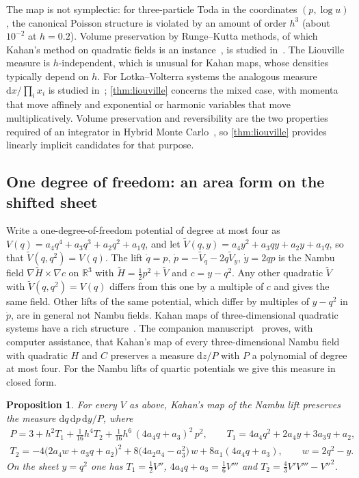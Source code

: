 \documentclass[11pt,a4paper]{article}
\newtheorem{proposition}[theorem]{Proposition}
\theoremstyle{definition}
\theoremstyle{remark}
\newcommand{\R}{\mathbb{R}}
\newcommand{\dd}{\mathrm{d}}
\begin{document}
The map is not symplectic: for three-particle Toda in the coordinates $(p,\log u)$, the canonical Poisson
structure is violated by an amount of order $h^3$ (about $10^{-2}$ at $h=0.2$). Volume preservation by
Runge--Kutta methods, of which Kahan's method on quadratic fields is an instance~\cite{CMOQ13}, is studied
in~\cite{BMQW16}.
The Liouville measure is $h$-independent, which is unusual for Kahan maps, whose densities typically depend on
$h$. For Lotka--Volterra systems the analogous measure $\dd x/\prod_ix_i$ is studied
in~\cite{KQV16,vdKMMQ24,LP}; \cref{thm:liouville} concerns the mixed case, with momenta that move affinely and
exponential or harmonic variables that move multiplicatively. Volume preservation and reversibility are the two properties required of an integrator in Hybrid Monte
Carlo~\cite{DKPR87}, so \cref{thm:liouville} provides linearly implicit candidates for that purpose.

\subsection{One degree of freedom: an area form on the shifted sheet}\label{sec:onedof}

Write a one-degree-of-freedom potential of degree at most four as $V(q)=a_4q^4+a_3q^3+a_2q^2+a_1q$, and let
$\tilde V(q,y)=a_4y^2+a_3qy+a_2y+a_1q$, so that $\tilde V(q,q^2)=V(q)$. The lift $\dot q=p$,
$\dot p=-\tilde V_q-2q\tilde V_y$, $\dot y=2qp$ is the Nambu field $\nabla\tilde H\times\nabla c$ on $\R^3$ with
$\tilde H=\frac12p^2+\tilde V$ and $c=y-q^2$. Any other quadratic $\tilde V$ with $\tilde V(q,q^2)=V(q)$ differs
from this one by a multiple of $c$ and gives the same field. Other lifts of the same potential, which differ by
multiples of $y-q^2$ in $\dot p$, are in general not Nambu fields. Kahan maps of three-dimensional quadratic
systems have a rich structure~\cite{HonePetrera09,CMMOQ14,PS18}. The companion manuscript~\cite{LP} proves,
with computer assistance, that Kahan's map of every three-dimensional Nambu field with quadratic $H$ and $C$
preserves a measure $\dd z/P$ with $P$ a polynomial of degree at most four. For the Nambu lifts of quartic
potentials we give this measure in closed form.

\begin{proposition}\label{prop:quarticdensity}
For every $V$ as above, Kahan's map of the Nambu lift preserves the measure $\dd q\,\dd p\,\dd y/P$, where
\begin{gather*}
P=3+h^2T_1+\tfrac1{16}h^4T_2+\tfrac1{16}h^6\,(4a_4q+a_3)^2\,p^2,\qquad T_1=4a_4q^2+2a_4y+3a_3q+a_2,\\
T_2=-4\big(2a_4w+a_3q+a_2\big)^2+8\big(4a_2a_4-a_3^2\big)\,w+8a_1(4a_4q+a_3),\qquad w=2q^2-y .
\end{gather*}
On the sheet $y=q^2$ one has $T_1=\frac12V''$, $4a_4q+a_3=\frac16V'''$ and $T_2=\frac43V'V'''-V''^2$.
\end{proposition}
\end{document}
